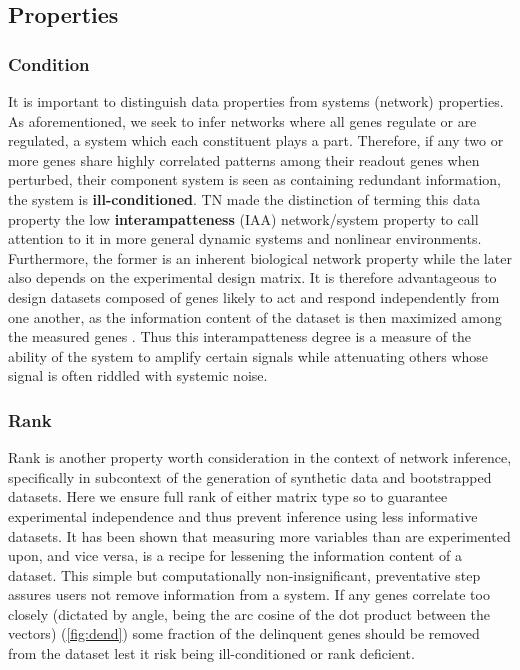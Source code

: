 \subsection{Properties}
\label{sec:prop}
\subsubsection{Condition}
\label{sec:cond}
It is important to distinguish data properties from systems (network) properties. As aforementioned, we seek to infer networks where all genes regulate or are regulated, \ie a system which each constituent plays a part. Therefore, if any two or more genes share highly correlated patterns among their readout genes when perturbed, their component system is seen as containing redundant information, \ie the system is \textbf{ill-conditioned}. TN made the distinction of terming this data property the low \textbf{interampatteness} (IAA) network/system property to call attention to it in more general dynamic systems and nonlinear environments. Furthermore, the former is an inherent biological network property while the later also depends on the experimental design matrix. It is therefore advantageous to design datasets composed of genes likely to act and respond independently from one another, as the information content of the dataset is then maximized among the measured genes \citep{subramanian2017next}. Thus this interampatteness degree is a measure of the ability of the system to amplify certain signals while attenuating others whose signal is often riddled with systemic noise.

\subsubsection{Rank}
\label{sec:rank}
Rank is another property worth consideration in the context of network inference, specifically in subcontext of the generation of synthetic data and bootstrapped datasets. Here we ensure full rank of either matrix type so to guarantee experimental independence and thus prevent inference using less informative datasets. It has been shown \citep{Nordling2013} that measuring more variables than are experimented upon, and vice versa, is a recipe for lessening the information content of a dataset. This simple but computationally non-insignificant, preventative step assures users not remove information from a system.  If any genes correlate too closely (dictated by angle, being the arc cosine of the dot product between the vectors) (\cref{fig:dend}) some fraction of the delinquent genes should be removed from the dataset lest it risk being ill-conditioned or rank deficient.

